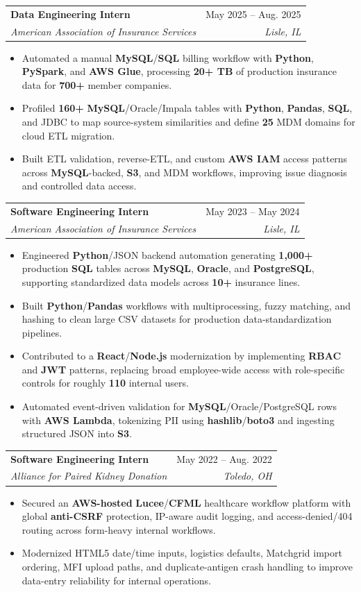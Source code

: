 \documentclass[letterpaper,11pt]{article}
\makeatletter
\newcommand{\resumeItem}[1]{
  \item\small{
    {#1 \vspace{-1pt}}
  }
}
\newcommand{\resumeSubheading}[4]{
  \vspace{-1pt}\item
    \begin{tabular*}{0.97\textwidth}[t]{l@{\extracolsep{\fill}}r}
      \textbf{#1} & #2 \\
      \textit{\small#3} & \textit{\small #4} \\
    \end{tabular*}\vspace{-3pt}
}
\newcommand{\resumeItemListStart}{\begin{itemize}[leftmargin=0.16in, itemsep=0pt, topsep=1pt, parsep=0pt]}
\newcommand{\resumeItemListEnd}{\end{itemize}\vspace{-4pt}}
\makeatother
\begin{document}
    \resumeSubheading
      {Data Engineering Intern}{May 2025 -- Aug. 2025}
      {American Association of Insurance Services}{Lisle, IL}
      \resumeItemListStart
        \resumeItem{Automated a manual \textbf{MySQL}/\textbf{SQL} billing workflow with \textbf{Python}, \textbf{PySpark}, and \textbf{AWS Glue}, processing \textbf{20+ TB} of production insurance data for \textbf{700+} member companies.}
        \resumeItem{Profiled \textbf{160+} \textbf{MySQL}/Oracle/Impala tables with \textbf{Python}, \textbf{Pandas}, \textbf{SQL}, and JDBC to map source-system similarities and define \textbf{25} MDM domains for cloud ETL migration.}
        \resumeItem{Built ETL validation, reverse-ETL, and custom \textbf{AWS IAM} access patterns across \textbf{MySQL}-backed, \textbf{S3}, and MDM workflows, improving issue diagnosis and controlled data access.}
      \resumeItemListEnd

    \resumeSubheading
      {Software Engineering Intern}{May 2023 -- May 2024}
      {American Association of Insurance Services}{Lisle, IL}
      \resumeItemListStart
        \resumeItem{Engineered \textbf{Python}/JSON backend automation generating \textbf{1,000+} production \textbf{SQL} tables across \textbf{MySQL}, \textbf{Oracle}, and \textbf{PostgreSQL}, supporting standardized data models across \textbf{10+} insurance lines.}
        \resumeItem{Built \textbf{Python}/\textbf{Pandas} workflows with multiprocessing, fuzzy matching, and hashing to clean large CSV datasets for production data-standardization pipelines.}
        \resumeItem{Contributed to a \textbf{React}/\textbf{Node.js} modernization by implementing \textbf{RBAC} and \textbf{JWT} patterns, replacing broad employee-wide access with role-specific controls for roughly \textbf{110} internal users.}
        \resumeItem{Automated event-driven validation for \textbf{MySQL}/Oracle/PostgreSQL rows with \textbf{AWS Lambda}, tokenizing PII using \textbf{hashlib}/\textbf{boto3} and ingesting structured JSON into \textbf{S3}.}
      \resumeItemListEnd

    \resumeSubheading
      {Software Engineering Intern}{May 2022 -- Aug. 2022}
      {Alliance for Paired Kidney Donation}{Toledo, OH}
      \resumeItemListStart
        \resumeItem{Secured an \textbf{AWS-hosted} \textbf{Lucee}/\textbf{CFML} healthcare workflow platform with global \textbf{anti-CSRF} protection, IP-aware audit logging, and access-denied/404 routing across form-heavy internal workflows.}
        \resumeItem{Modernized HTML5 date/time inputs, logistics defaults, Matchgrid import ordering, MFI upload paths, and duplicate-antigen crash handling to improve data-entry reliability for internal operations.}
      \resumeItemListEnd
\end{document}
